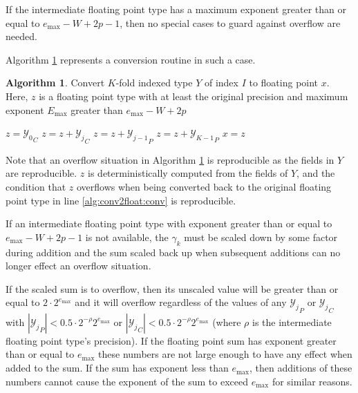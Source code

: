 \documentclass[12pt]{article}
\providecommand{\max}{\ensuremath{\text{max}}}
\providecommand{\To}{\ensuremath{\text{ to }}}
\theoremstyle{definition}
\newtheorem{alg}{Algorithm}[section]
\numberwithin{equation}{section}
\numberwithin{figure}{section}
\begin{document}
    If the intermediate floating point type has a maximum exponent greater than or equal to $e_{\max} - W + 2  p - 1$, then no special cases to guard against overflow are needed.

    Algorithm \ref{alg:conv2float} represents a conversion routine in such a case.

    \begin{samepage}
    \begin{alg}
      Convert $K$-fold indexed type $Y$ of index $I$ to floating point $x$. Here, $z$ is a floating point type with at least the original precision and maximum exponent $E_{\max}$ greater than $e_{\max} - W + 2  p$
      \begin{algorithmic}[1]
          \State $z = {\mathcal{Y}_0}_C$
          \For{$j = 1 \To K - 1$}
            \State $z = z + {\mathcal{Y}_j}_C$
            \State $z = z + {\mathcal{Y}_{j - 1}}_P$
          \EndFor
          \State $z = z + {\mathcal{Y}_{K - 1}}_P$
          \State $x = z$ \label{alg:conv2float:conv}
        \EndFunction
      \end{algorithmic}
      \label{alg:conv2float}
    \end{alg}
    \end{samepage}

    Note that an overflow situation in Algorithm \ref{alg:conv2float} is reproducible as the fields in $Y$ are reproducible. $z$ is deterministically computed from the fields of $Y$, and the condition that $z$ overflows when being converted back to the original floating point type in line \ref{alg:conv2float:conv} is reproducible.

    If an intermediate floating point type with exponent greater than or equal to $e_{\max} - W + 2  p - 1$ is not available, the $\gamma_k$ must be scaled down by some factor during addition and the sum scaled back up when subsequent additions can no longer effect an overflow situation.

    If the scaled sum is to overflow, then its unscaled value will be greater than or equal to $2 \cdot 2^{e_{\max}}$ and it will overflow regardless of the values of any ${\mathcal{Y}_j}_P$ or ${\mathcal{Y}_j}_C$ with $|{\mathcal{Y}_j}_P| < 0.5 \cdot 2^{-\rho} 2^{e_{\max}}$ or $|{\mathcal{Y}_j}_C| < 0.5 \cdot 2^{-\rho}2^{e_{\max}}$ (where $\rho$ is the intermediate floating point type's precision). If the floating point sum has exponent greater than or equal to $e_{\max}$ these numbers are not large enough to have any effect when added to the sum. If the sum has exponent less than $e_{\max}$, then additions of these numbers cannot cause the exponent of the sum to exceed $e_{\max}$ for similar reasons.
\end{document}
